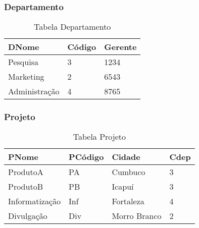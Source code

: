 \documentclass[a4paper,12pt]{article}
\begin{document}
\subsubsection*{Departamento}
\begin{table}[h]
\centering
\caption{Tabela Departamento}
\begin{tabular}{|l|l|l|}
\hline
\textbf{DNome}      & \textbf{Código} & \textbf{Gerente} \\ \hline
Pesquisa           & 3               & 1234             \\ \hline
Marketing          & 2               & 6543             \\ \hline
Administração      & 4               & 8765             \\ \hline
\end{tabular}
\end{table}

\subsubsection*{Projeto}
\begin{table}[h]
\centering
\caption{Tabela Projeto}
\begin{tabular}{|l|l|l|l|}
\hline
\textbf{PNome}         & \textbf{PCódigo} & \textbf{Cidade}   & \textbf{Cdep} \\ \hline
ProdutoA              & PA               & Cumbuco          & 3            \\ \hline
ProdutoB              & PB               & Icapuí           & 3            \\ \hline
Informatização        & Inf              & Fortaleza        & 4            \\ \hline
Divulgação            & Div              & Morro Branco     & 2            \\ \hline
\end{tabular}
\end{table}
\end{document}
